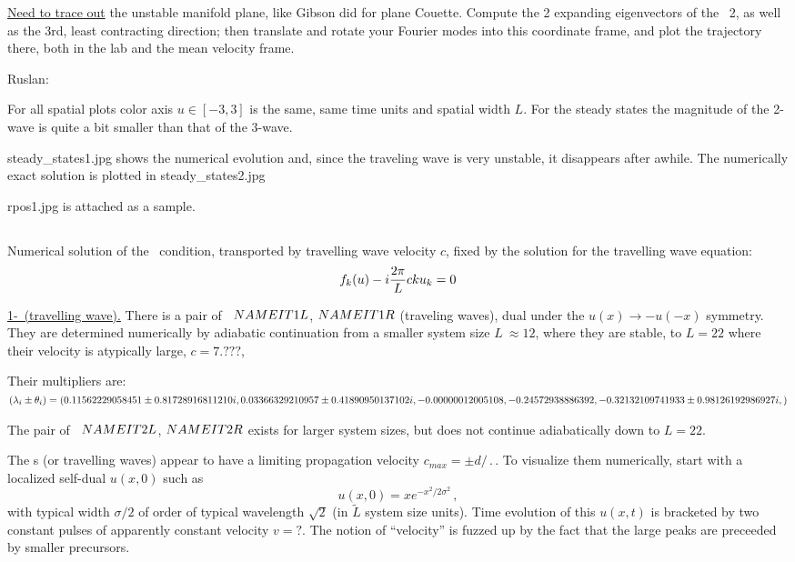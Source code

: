 \underline{Need to trace out}
the unstable manifold plane, like Gibson did for plane Couette.
Compute the 2 expanding eigenvectors of the
\eqv\ {\nameit}2, as well as the 3rd, least contracting direction; then
translate and rotate your Fourier modes into this coordinate frame,
and plot the trajectory there, both in the lab and the mean velocity frame.

Ruslan: %
% 

For all spatial plots color axis $u \in [-3, 3]$ is the same,
same time units and spatial width $L$.
For the steady states the magnitude of the 2-wave is quite 
a bit smaller than that of the 3-wave.

steady\_states1.jpg shows the numerical evolution and, since the
traveling wave is very unstable, it disappears after awhile. 
The numerically exact solution is plotted in steady\_states2.jpg

rpos1.jpg is attached as a sample. 

\subsection{\Reqva}

Numerical solution of the \reqv\  condition,
transported by travelling wave velocity $c$, 
fixed by the solution for the travelling wave equation:
\[
f_k(u) - i{2\pi\over L} c k u_k = 0
\]

\underline{1-\reqv\  (travelling wave).}
There is a pair of \Reqva\ 
${NAMEIT}1L$,
${NAMEIT}1R$
(traveling waves), dual under the
$u(x) \to -u(-x)$ symmetry. They are 
determined numerically by 
adiabatic continuation from a smaller system size
$L~\approx 12$,
where they are stable, to $L=22$
where their velocity is atypically large, $c=7.???$,

Their multipliers are:
$(\lambda_i \pm \theta_i)=
(
  0.11562229058451 \pm 0.81728916811210i,
  0.03366329210957 \pm 0.41890950137102i,
 -0.00000012005108                    ,
 -0.24572938886392                    ,
 -0.32132109741933 \pm 0.98126192986927i,
)$

The pair of \Reqva\ 
${NAMEIT}2L$,
${NAMEIT}2R$
exists for larger system sizes, but does not continue 
adiabatically down to $L=22$.

The \reqva s (or travelling waves) appear to have a limiting propagation
velocity $c_{max} = \pm d/\period{}$. 
To visualize them numerically,
start with a localized self-dual $u(x,0)$ such as
\[
u(x,0) = x e^{- x^2/2\sigma^2}
\,,
\]
with typical width $\sigma/2$ of order of typical wavelength 
$\sqrt{2}$ (in $\tilde{L}$ system size units).
Time evolution of this  $u(x,t)$ is bracketed by two constant 
pulses of apparently constant velocity $v=?$.
\RLD{generate figure, state $\sigma/2$, estimate $v$}
The notion of ``velocity''
is fuzzed up by the fact that the large peaks are preceeded
by smaller precursors.

